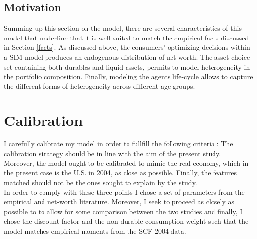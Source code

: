 \documentclass[12pt,a4paper,leqno]{article}
\theoremstyle{definition}
\begin{document}
\subsection{Motivation}
Summing up this section on the model, there are several characteristics of this model that underline that it is well suited to match the empirical facts discussed in Section \ref{facts}. As discussed above, the consumers' optimizing decisions within a SIM-model produces an endogenous distribution of net-worth. The asset-choice set containing both durables and liquid assets, permits to model heterogeneity in the portfolio composition. Finally, modeling the agents life-cycle allows to capture the different forms of heterogeneity across different age-groups. 

\section{Calibration}

I carefully calibrate my model in order to fullfill the following criteria \citep{kydland1996computational}: The calibration strategy should be in line with the aim of the present study. Moreover, the model ought to be calibrated to mimic the real economy, which in the present case is the U.S. in 2004, as close as possible. Finally, the features matched should not be the ones sought to explain by the study. \\
In order to comply with these three points I chose a set of parameters from the empirical and net-worth literature. Moreover, I seek to proceed as closely as possible to \cite{hintermaier2011} to allow for some comparison between the two studies and finally, I chose the discount factor and the non-durable consumption weight such that the model matches empirical moments from the SCF 2004 data. 
\end{document}
